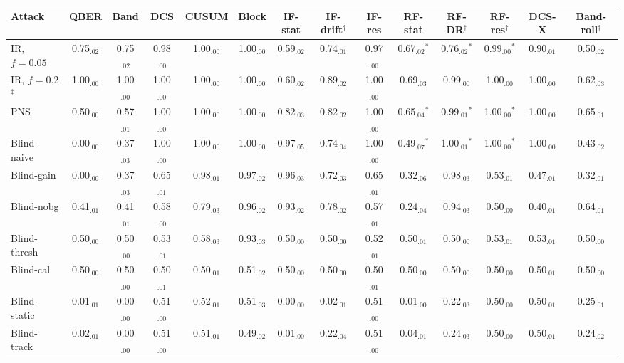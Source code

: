 \begin{tabular}{lccccccccccccc}
\hline
Attack & QBER & Band & DCS & CUSUM & Block & IF-stat & IF-drift$^\dagger$ & IF-res & RF-stat & RF-DR$^\dagger$ & RF-res$^\dagger$ & DCS-X & Band-roll$^\dagger$\\
\hline
IR, $f=0.05$ & 0.75$_{.02}$ & 0.75$_{.02}$ & 0.98$_{.00}$ & 1.00$_{.00}$ & 1.00$_{.00}$ & 0.59$_{.02}$ & 0.74$_{.01}$ & 0.97$_{.00}$ & 0.67$_{.02}$$^*$ & 0.76$_{.02}$$^*$ & 0.99$_{.00}$$^*$ & 0.90$_{.01}$ & 0.50$_{.02}$\\
IR, $f=0.2$$^\ddagger$ & 1.00$_{.00}$ & 1.00$_{.00}$ & 1.00$_{.00}$ & 1.00$_{.00}$ & 1.00$_{.00}$ & 0.60$_{.02}$ & 0.89$_{.02}$ & 1.00$_{.00}$ & 0.69$_{.03}$ & 0.99$_{.00}$ & 1.00$_{.00}$ & 1.00$_{.00}$ & 0.62$_{.03}$\\
PNS & 0.50$_{.00}$ & 0.57$_{.01}$ & 1.00$_{.00}$ & 1.00$_{.00}$ & 1.00$_{.00}$ & 0.82$_{.03}$ & 0.82$_{.02}$ & 1.00$_{.00}$ & 0.65$_{.04}$$^*$ & 0.99$_{.01}$$^*$ & 1.00$_{.00}$$^*$ & 1.00$_{.00}$ & 0.65$_{.01}$\\
Blind-naive & 0.00$_{.00}$ & 0.37$_{.03}$ & 1.00$_{.00}$ & 1.00$_{.00}$ & 1.00$_{.00}$ & 0.97$_{.05}$ & 0.74$_{.04}$ & 1.00$_{.00}$ & 0.49$_{.07}$$^*$ & 1.00$_{.01}$$^*$ & 1.00$_{.00}$$^*$ & 1.00$_{.00}$ & 0.43$_{.02}$\\
Blind-gain & 0.00$_{.00}$ & 0.37$_{.03}$ & 0.65$_{.01}$ & 0.98$_{.01}$ & 0.97$_{.02}$ & 0.96$_{.03}$ & 0.72$_{.03}$ & 0.65$_{.01}$ & 0.32$_{.06}$ & 0.98$_{.03}$ & 0.53$_{.01}$ & 0.47$_{.01}$ & 0.32$_{.01}$\\
Blind-nobg & 0.41$_{.01}$ & 0.41$_{.01}$ & 0.58$_{.00}$ & 0.79$_{.03}$ & 0.96$_{.02}$ & 0.93$_{.02}$ & 0.78$_{.02}$ & 0.57$_{.01}$ & 0.24$_{.04}$ & 0.94$_{.03}$ & 0.50$_{.00}$ & 0.40$_{.01}$ & 0.64$_{.01}$\\
Blind-thresh & 0.50$_{.00}$ & 0.50$_{.00}$ & 0.53$_{.01}$ & 0.58$_{.03}$ & 0.93$_{.03}$ & 0.50$_{.00}$ & 0.50$_{.00}$ & 0.52$_{.01}$ & 0.50$_{.01}$ & 0.50$_{.00}$ & 0.53$_{.01}$ & 0.53$_{.01}$ & 0.50$_{.00}$\\
Blind-cal & 0.50$_{.00}$ & 0.50$_{.00}$ & 0.50$_{.01}$ & 0.50$_{.01}$ & 0.51$_{.02}$ & 0.50$_{.00}$ & 0.50$_{.00}$ & 0.50$_{.01}$ & 0.50$_{.00}$ & 0.50$_{.00}$ & 0.50$_{.00}$ & 0.50$_{.01}$ & 0.50$_{.00}$\\
Blind-static & 0.01$_{.01}$ & 0.00$_{.00}$ & 0.51$_{.00}$ & 0.52$_{.01}$ & 0.51$_{.03}$ & 0.00$_{.00}$ & 0.02$_{.01}$ & 0.51$_{.00}$ & 0.01$_{.00}$ & 0.22$_{.03}$ & 0.50$_{.00}$ & 0.50$_{.01}$ & 0.25$_{.01}$\\
Blind-track & 0.02$_{.01}$ & 0.00$_{.00}$ & 0.51$_{.00}$ & 0.51$_{.01}$ & 0.49$_{.02}$ & 0.01$_{.00}$ & 0.22$_{.04}$ & 0.51$_{.00}$ & 0.04$_{.01}$ & 0.24$_{.03}$ & 0.50$_{.00}$ & 0.50$_{.01}$ & 0.24$_{.02}$\\

\end{tabular}
